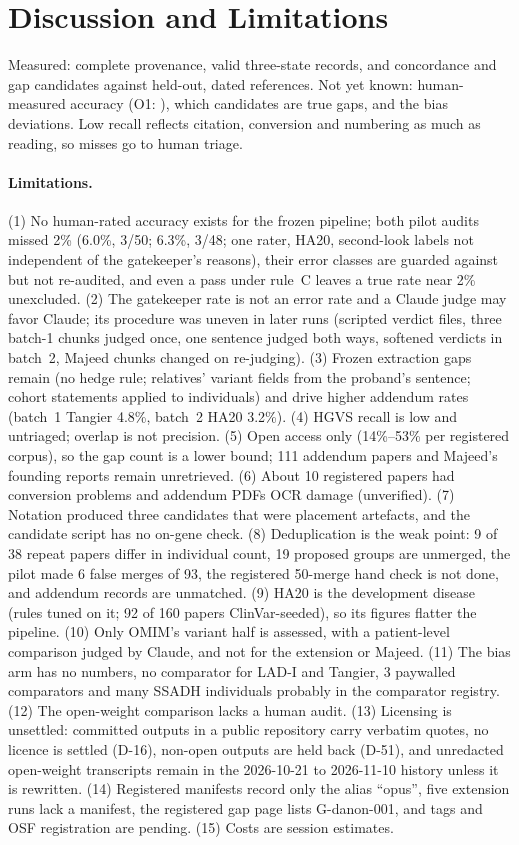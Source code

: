 \documentclass{article} %
\begin{document}
\section{Discussion and Limitations}
\label{sec:discussion}
Measured: complete provenance, valid three-state records, and concordance and gap candidates against held-out, dated references. Not yet known: human-measured accuracy (O1: ), which candidates are true gaps, and the bias deviations. Low recall reflects citation, conversion and numbering as much as reading, so misses go to human triage.

\paragraph{Limitations.} (1) No human-rated accuracy exists for the frozen pipeline; both pilot audits missed 2\% (6.0\%, 3/50; 6.3\%, 3/48; one rater, HA20, second-look labels not independent of the gatekeeper's reasons), their error classes are guarded against but not re-audited, and even a pass under rule~C leaves a true rate near 2\% unexcluded. (2) The gatekeeper rate is not an error rate and a Claude judge may favor Claude; its procedure was uneven in later runs (scripted verdict files, three batch-1 chunks judged once, one sentence judged both ways, softened verdicts in batch~2, Majeed chunks changed on re-judging). (3) Frozen extraction gaps remain (no hedge rule; relatives' variant fields from the proband's sentence; cohort statements applied to individuals) and drive higher addendum rates (batch~1 Tangier 4.8\%, batch~2 HA20 3.2\%). (4) HGVS recall is low and untriaged; overlap is not precision. (5) Open access only (14\%--53\% per registered corpus), so the gap count is a lower bound; 111 addendum papers and Majeed's founding reports remain unretrieved. (6) About 10 registered papers had conversion problems and addendum PDFs OCR damage (unverified). (7) Notation produced three candidates that were placement artefacts, and the candidate script has no on-gene check. (8) Deduplication is the weak point: 9 of 38 repeat papers differ in individual count, 19 proposed groups are unmerged, the pilot made 6 false merges of 93, the registered 50-merge hand check is not done, and addendum records are unmatched. (9) HA20 is the development disease (rules tuned on it; 92 of 160 papers ClinVar-seeded), so its figures flatter the pipeline. (10) Only OMIM's variant half is assessed, with a patient-level comparison judged by Claude, and not for the extension or Majeed. (11) The bias arm has no numbers, no comparator for LAD-I and Tangier, 3 paywalled comparators and many SSADH individuals probably in the comparator registry. (12) The open-weight comparison lacks a human audit. (13) Licensing is unsettled: committed outputs in a public repository carry verbatim quotes, no licence is settled (D-16), non-open outputs are held back (D-51), and unredacted open-weight transcripts remain in the 2026-10-21 to 2026-11-10 history unless it is rewritten. (14) Registered manifests record only the alias ``opus'', five extension runs lack a manifest, the registered gap page lists G-danon-001, and tags and OSF registration are pending. (15) Costs are session estimates. 
\end{document}
